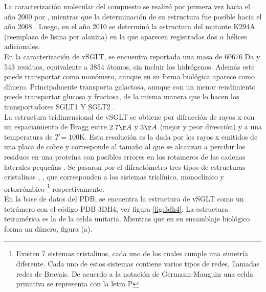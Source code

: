 La caracterizaci\'{o}n molecular del compuesto se realiz\'{o} por primera vez hacia el a\~{n}o 2000 por \cite{Turk2000}, mientras que la determinaci\'{o}n de su estructura fue posible hacia el a\~{n}o 2008 \cite{Faham2008}. Luego, en el a\~{n}o 2010 se determin\'{o} la estructura del mutante K294A (reemplazo de lisina por alanina) en la que aparecen registradas dos $\alpha$ h\'{e}lices adicionales.\\

En la caracterizaci\'{o}n de vSGLT, se encuentra reportada una  masa de 60676 Da y 543 residuos, equivalente a 3854 \'{a}tomos, sin incluir los hidr\'{o}genos. Adem\'{a}s este puede transportar como mon\'{o}mero,  aunque en su forma biol\'{o}gica aparece como d\'{i}mero. Principalmente transporta galactosa, aunque con un menor rendimiento puede transportar glucosa y fructosa, de la misma manera que lo hacen los transportadores SGLT1 Y SGLT2 \cite{SaierJr.}.\\

La estructura tridimensional de vSGLT \cite{Faham2008} se obtiene por difracci\'{o}n de rayos x con un espaciamiento de Bragg entre $2.7\AA$ y $3\AA$ (mejor y peor direcci\'{o}n) y  a una temperatura de $T=100$K. Esta  resoluci\'{o}n es la dada por los rayos x emitidos de una placa de cobre y corresponde al tama\~{n}o al que se alcanzan a percibir los residuos en una prote\'{i}na con posibles errores en los rotameros de las cadenas laterales peque\~{n}as \cite{Huang2007}. Se pasaron por el difract\'{o}metro tres tipos de estructuras cristalinas , ,   que corresponden a los sistemas tricl\'{i}nico, monocl\'{i}nico y ortorr\'{o}mbico \footnote{Existen 7 sistemas cristalinos, cada uno de los cuales cumple una simetr\'{i}a diferente. Cada uno de estos sistemas contiene varios tipos de redes, llamadas redes de Bravais. De acuerdo a la notaci\'{o}n de Germann-Mauguin una celda primitiva se representa con la letra P } respectivamente.\\

En la base de datos del PDB, se encuentra la estructura de vSGLT  como un tetr\'{a}mero con el c\'{o}digo PDB 3DH4, ver figura \ref{fig:3dh4}. La estructura tetram\'{e}rica es la de la celda unitaria. Mientras que en su ensamblaje biol\'{o}gico forma un d\'{i}mero, figura \label{fig:complejo} (a).

